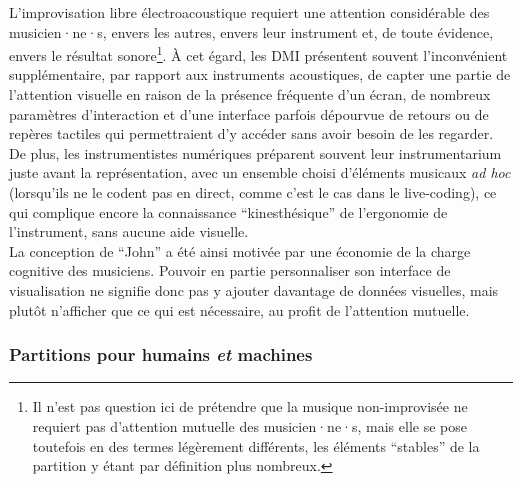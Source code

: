 \noindent L'improvisation libre électroacoustique requiert une attention considérable des musicien·ne·s, envers les autres, envers leur instrument et, de toute évidence, envers le résultat sonore\footnote{Il n'est pas question ici de prétendre que la musique non-improvisée ne requiert pas d'attention mutuelle des musicien·ne·s, mais elle se pose toutefois en des termes légèrement différents, les éléments ``stables'' de la partition y étant par définition plus nombreux.}. À cet égard, les \gls{DMI} présentent souvent l'inconvénient supplémentaire, par rapport aux instruments acoustiques, de capter une partie de l'attention visuelle en raison de la présence fréquente d'un écran, de nombreux paramètres d'interaction et d'une interface parfois dépourvue de retours ou de repères tactiles qui permettraient d'y accéder sans avoir besoin de les regarder. De plus, les instrumentistes numériques préparent souvent leur instrumentarium juste avant la représentation, avec un ensemble choisi d'éléments musicaux \textit{ad hoc} (lorsqu'ils ne le codent pas en direct, comme c'est le cas dans le live-coding), ce qui complique encore la connaissance ``kinesthésique'' de l'ergonomie de l'instrument, sans aucune aide visuelle.\\
\indent La conception de ``John'' a été ainsi motivée par une économie de la charge cognitive des musiciens. Pouvoir en partie personnaliser son interface de visualisation ne signifie donc pas y ajouter davantage de données visuelles, mais plutôt n'afficher que ce qui est nécessaire, au profit de l'attention mutuelle.

\subsubsection{Partitions pour humains \emph{et} machines}
\label{sec:notation:score_for_humans_and_machines}

